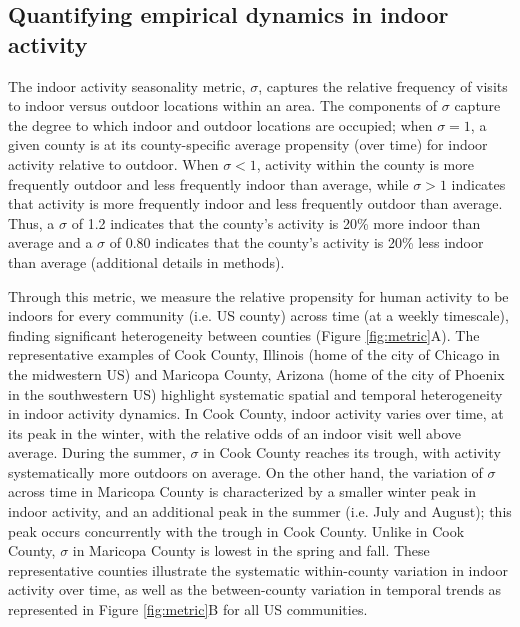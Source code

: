 \documentclass{article}
\begin{document}
\subsection*{Quantifying empirical dynamics in indoor activity}
The indoor activity seasonality metric, $\sigma$, captures the relative frequency of visits to indoor versus outdoor locations within an area. The components of $\sigma$ capture the degree to which indoor and outdoor locations are occupied;  when $\sigma = 1$, a given county is at its county-specific average propensity (over time) for indoor activity relative to outdoor. When $\sigma < 1$, activity within the county is more frequently outdoor and  less frequently indoor than average, while $\sigma > 1$ indicates that activity is more frequently indoor and less frequently outdoor than average. Thus, a $\sigma$ of 1.2 indicates that the county's activity is 20\% more indoor than average and a $\sigma$ of 0.80 indicates that the county's activity is 20\% less indoor than average (additional details in methods).

Through this metric, we measure the relative propensity for human activity to be indoors for every community (i.e. US county) across time (at a weekly timescale), finding significant heterogeneity between counties (Figure \ref{fig:metric}A). The representative examples of Cook County, Illinois (home of the city of Chicago in the midwestern US) and Maricopa County, Arizona (home of the city of Phoenix in the southwestern US) highlight systematic spatial and temporal heterogeneity in indoor activity dynamics. In Cook County, indoor activity varies over time, at its peak in the winter, with the relative odds of an indoor visit well above average. During the summer, $\sigma$ in Cook County reaches its trough, with activity systematically more outdoors on average. On the other hand, the variation of $\sigma$ across time in Maricopa County is characterized by a smaller winter peak in indoor activity, and an additional peak in the summer (i.e. July and August); this peak occurs concurrently with the trough in Cook County. Unlike in Cook County, $\sigma$ in Maricopa County is lowest in the spring and fall. These representative counties illustrate the systematic within-county variation in indoor activity over time, as well as the between-county variation in temporal trends as represented in Figure \ref{fig:metric}B for all US communities.
\end{document}
